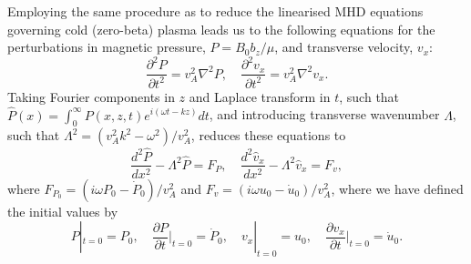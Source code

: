 \documentclass{aastex61}
\begin{document}
Employing the same procedure as \cite{rud_etal06} to reduce the linearised MHD equations governing cold (zero-beta) plasma leads us to the following equations for the perturbations in magnetic pressure, $P = B_0b_z/\mu$, and transverse velocity, $v_x$:
\begin{equation}
\frac{\partial^2P}{\partial{}t^2} = v_A^2 \nabla^2P, \quad \frac{\partial^2v_x}{\partial{}t^2} = v_A^2 \nabla^2v_x.
\end{equation}
Taking Fourier components in $z$ and Laplace transform in $t$, such that $\hat{P}(x) = \int_0^\infty P(x,z,t)e^{i(\omega{}t-kz)} dt$, and introducing transverse wavenumber $\Lambda$, such that $\Lambda^2 = (v_A^2k^2 - \omega^2) / v_A^2$, reduces these equations to
\begin{equation}
\frac{d^2\hat{P}}{dx^2} - \Lambda^2 \hat{P} = F_P, \quad \frac{d^2\hat{v}_x}{dx^2} - \Lambda^2 \hat{v}_x = F_v,
\end{equation}
where $F_{P_0} = (i\omega P_0 - \dot{P}_0) / v_A^2$ and $F_v = (i\omega u_0 - \dot{u}_0) / v_A^2$, where we have defined the initial values by
\begin{equation}
P|_{t=0} = P_0, \quad \frac{\partial{}P}{\partial{t}}\biggr\rvert_{t=0} = \dot{P}_0, \quad v_x|_{t=0} = u_0, \quad \frac{\partial{}v_x}{\partial{t}}\biggr\rvert_{t=0} = \dot{u}_0.
\end{equation}
\end{document}
